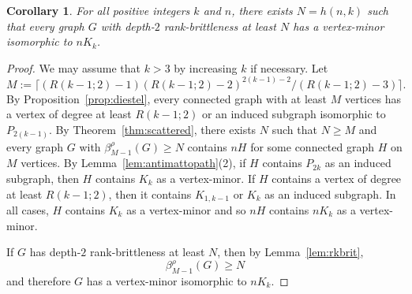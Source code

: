 \documentclass[11pt]{article}
\newtheorem{corollary}[theorem]{Corollary}
\begin{document}
        \begin{corollary}\label{cor:scattered}
          For all positive integers $k$ and  $n$, there exists $N=h(n,k)$ such that 
          every graph $G$ with depth-$2$ rank-brittleness at least $N$
          has a vertex-minor isomorphic to $n K_k$.
        \end{corollary}
        \begin{proof}
          We may assume that $k>3$ by increasing $k$ if necessary.
          Let 
          \[M:=\lceil (R(k-1;2)-1)(R(k-1;2)-2)^{2(k-1)-2}/(R(k-1;2)-3)\rceil .\]
          By Proposition~\ref{prop:diestel}, 
          every connected graph with at least $M$ vertices
          has a vertex of degree at least $R(k-1;2)$
          or an induced subgraph isomorphic to $P_{2(k-1)}$.
          By Theorem~\ref{thm:scattered},
          there exists $N$ such that
          $N\ge M$ and 
          every graph $G$ with $\beta^\rho_{M-1}(G)\ge N$
          contains $nH$  for some connected graph $H$ on $M$ vertices.
          By Lemma~\ref{lem:antimattopath}(2),
          if $H$ contains $P_{2k}$ as an induced subgraph, then $H$ contains $K_k$
          as a vertex-minor.
          If $H$ contains a vertex of degree at least $R(k-1;2)$, then it contains
          $K_{1,k-1}$ or $K_{k}$ as an induced subgraph.
          In all cases, $H$ contains $K_k$ as a vertex-minor and so
          $nH$ contains $nK_k$ as a vertex-minor.

          If $G$ has depth-$2$ rank-brittleness at least $N$,
          then by Lemma~\ref{lem:rkbrit},
          \[\beta^\rho_{M-1}(G)\ge N\]
          and therefore $G$ has a vertex-minor isomorphic to $nK_k$.
        \end{proof}
\end{document}
